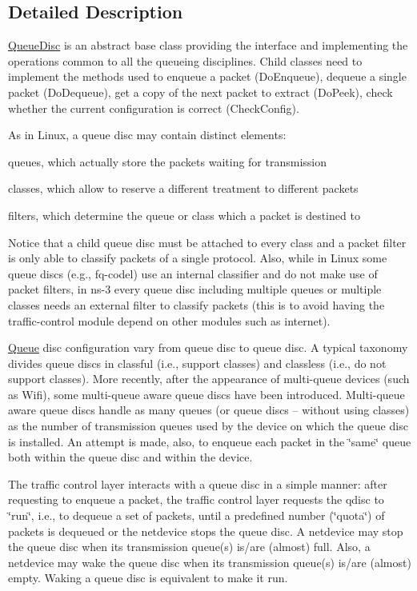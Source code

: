 \subsection{Detailed Description}
\hyperlink{classns3_1_1QueueDisc}{Queue\+Disc} is an abstract base class providing the interface and implementing the operations common to all the queueing disciplines. Child classes need to implement the methods used to enqueue a packet (Do\+Enqueue), dequeue a single packet (Do\+Dequeue), get a copy of the next packet to extract (Do\+Peek), check whether the current configuration is correct (Check\+Config).

As in Linux, a queue disc may contain distinct elements\+:
\begin{DoxyItemize}
\item queues, which actually store the packets waiting for transmission
\item classes, which allow to reserve a different treatment to different packets
\item filters, which determine the queue or class which a packet is destined to
\end{DoxyItemize}

Notice that a child queue disc must be attached to every class and a packet filter is only able to classify packets of a single protocol. Also, while in Linux some queue discs (e.\+g., fq-\/codel) use an internal classifier and do not make use of packet filters, in ns-\/3 every queue disc including multiple queues or multiple classes needs an external filter to classify packets (this is to avoid having the traffic-\/control module depend on other modules such as internet).

\hyperlink{classns3_1_1Queue}{Queue} disc configuration vary from queue disc to queue disc. A typical taxonomy divides queue discs in classful (i.\+e., support classes) and classless (i.\+e., do not support classes). More recently, after the appearance of multi-\/queue devices (such as Wifi), some multi-\/queue aware queue discs have been introduced. Multi-\/queue aware queue discs handle as many queues (or queue discs -- without using classes) as the number of transmission queues used by the device on which the queue disc is installed. An attempt is made, also, to enqueue each packet in the \char`\"{}same\char`\"{} queue both within the queue disc and within the device.

The traffic control layer interacts with a queue disc in a simple manner\+: after requesting to enqueue a packet, the traffic control layer requests the qdisc to \char`\"{}run\char`\"{}, i.\+e., to dequeue a set of packets, until a predefined number (\char`\"{}quota\char`\"{}) of packets is dequeued or the netdevice stops the queue disc. A netdevice may stop the queue disc when its transmission queue(s) is/are (almost) full. Also, a netdevice may wake the queue disc when its transmission queue(s) is/are (almost) empty. Waking a queue disc is equivalent to make it run.

